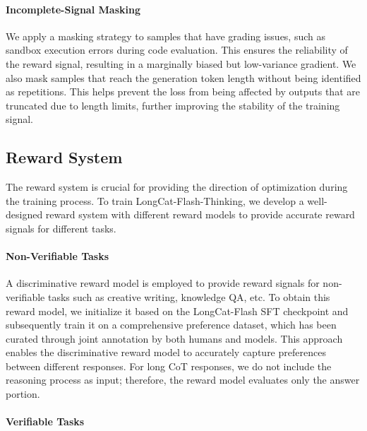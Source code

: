 \noindent\paragraph{Incomplete-Signal Masking} We apply a masking strategy to samples that have grading issues, such as sandbox execution errors during code evaluation. This ensures the reliability of the reward signal, resulting in a marginally biased but low-variance gradient. We also mask samples that reach the generation token length without being identified as repetitions. This helps prevent the loss from being affected by outputs that are truncated due to length limits, further improving the stability of the training signal.

\subsection{Reward System}
The reward system is crucial for providing the direction of optimization during the training process. To train LongCat-Flash-Thinking, we develop a well-designed reward system with different reward models to provide accurate reward signals for different tasks.


\noindent\paragraph{Non-Verifiable Tasks}
A discriminative reward model is employed to provide reward signals for non-verifiable tasks such as creative writing, knowledge QA, etc. To obtain this reward model, we initialize it based on the LongCat-Flash SFT checkpoint and subsequently train it on a comprehensive preference dataset, which has been curated through joint annotation by both humans and models. This approach enables the discriminative reward model to accurately capture preferences between different responses. For long CoT responses, we do not include the reasoning process as input; therefore, the reward model evaluates only the answer portion.

\noindent\paragraph{Verifiable Tasks}

